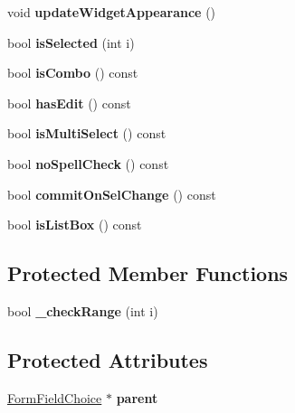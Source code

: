 \begin{DoxyCompactItemize}
void {\bfseries update\+Widget\+Appearance} ()
\item 
\mbox{\label{class_form_widget_choice_a19b066789905a55c83fb52fe5d12ac04}} 
bool {\bfseries is\+Selected} (int i)
\item 
\mbox{\label{class_form_widget_choice_adfb3b5295b9465c5584f8a495a7753a4}} 
bool {\bfseries is\+Combo} () const
\item 
\mbox{\label{class_form_widget_choice_a638eadafe01fef5166dbb5a3301ff370}} 
bool {\bfseries has\+Edit} () const
\item 
\mbox{\label{class_form_widget_choice_ac5f9ce4cfcea974408b54aac985affd9}} 
bool {\bfseries is\+Multi\+Select} () const
\item 
\mbox{\label{class_form_widget_choice_a1b1386cc4e4d30196c3c933b4febf2b4}} 
bool {\bfseries no\+Spell\+Check} () const
\item 
\mbox{\label{class_form_widget_choice_aa8aefc74ed318ece3337505fa8b5afcf}} 
bool {\bfseries commit\+On\+Sel\+Change} () const
\item 
\mbox{\label{class_form_widget_choice_a506bf4336843c88e1dc4a7ad9d7c3831}} 
bool {\bfseries is\+List\+Box} () const
\end{DoxyCompactItemize}
\subsection*{Protected Member Functions}
\begin{DoxyCompactItemize}
\item 
\mbox{\label{class_form_widget_choice_a29ebd78a86859531de8ec1d08cdf407f}} 
bool {\bfseries \+\_\+check\+Range} (int i)
\end{DoxyCompactItemize}
\subsection*{Protected Attributes}
\begin{DoxyCompactItemize}
\item 
\mbox{\label{class_form_widget_choice_a5746a978d107c2788739671d02b57dd8}} 
\hyperlink{class_form_field_choice}{Form\+Field\+Choice} $\ast$ {\bfseries parent}
\end{DoxyCompactItemize}
